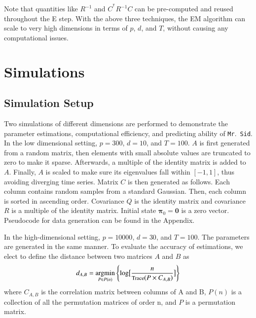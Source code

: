 \documentclass[times,twocolumn,final,authoryear]{elsarticle}
\newcommand{\mrsid}{{\sc \texttt{Mr}.~\texttt{Sid}}}
\newcommand{\T}{^{\ensuremath{\mathsf{T}}}}           %
\newcommand{\argmin}{\operatornamewithlimits{argmin}}
\begin{document}
Note that quantities like $R^{-1}$ and $C^{\T}R^{-1}C$ can be pre-computed and reused throughout the E step. With the above three techniques, the EM algorithm can scale to very high dimensions in terms of $p$, $d$, and $T$, without causing any computational issues.
\section{Simulations}
\subsection{Simulation Setup}
\label{sec:simsetup}
Two simulations of different dimensions are performed to demonstrate the parameter estimations, computational efficiency, and predicting ability of \mrsid.
In the low dimensional setting, $p = 300$, $d = 10$, and $T = 100$. $A$ is first generated from a random matrix, then elements with small absolute values are truncated to zero to make it sparse. Afterwards, a multiple of the identity matrix is added to $A$. Finally, $A$ is scaled to make sure its eigenvalues fall within $[-1,1]$, thus avoiding diverging time series. Matrix $C$ is then generated as follows. Each column contains random samples from a standard Gaussian. Then, each column is sorted in ascending order. Covariance $Q$ is the identity matrix and covariance $R$ is a multiple of the identity matrix. Initial state $\mathbf{\pi}_0 = \mathbf{0}$ is a zero vector. Pseudocode for data generation can be found in the Appendix.

In the high-dimensional setting, $p = 10000$, $d = 30$, and $T = 100$. The parameters are generated in the same manner. To evaluate the accuracy of estimations, we elect to define the distance between two matrices $A$ and $B$ as
\begin{equation}\label{eq:distance}
d_{A,B} = \argmin_{P\in P(n)}\left\{\log\bigl[\frac{n}{\text{\footnotesize Trace}(P\times C_{A,B})}\bigr]\right\}
\end{equation}
where $C_{A,B}$ is the correlation matrix between columns of A and B, $P(n)$ is a collection of all the permutation matrices of order n, and $P$ is a permutation matrix.
\end{document}
